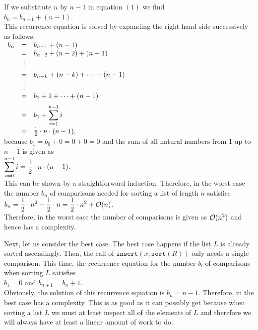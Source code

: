If we substitute $n$ by $n-1$ in equation $(1)$ we find
\\[0.2cm]
\hspace*{1.3cm}
$b_n = b_{n-1} + (n - 1)$.
\\[0.2cm]
This recurrence equation is solved by expanding the right hand side successively as follows:
\\[0.2cm]
\hspace*{1.3cm}
$
\begin{array}[t]{lcl}
  b_{n} & = & b_{n-1} + (n - 1)                     \\ 
        & = & b_{n-2} + (n - 2) + (n - 1)           \\ 
        & \vdots &                                  \\
        & = & b_{n-k} + (n - k) + \cdots + (n - 1)  \\ 
        & \vdots &                                  \\
        & = & b_{1} + 1 + \cdots + (n - 1)      \\[0.2cm] 
        & = & \displaystyle b_{1} + \sum\limits_{i = 1}^{n - 1} i \\[0.4cm]
        & = & \frac{1}{2} \cdot n \cdot (n - 1),
\end{array}
$
\\[0.2cm]
because $b_1 = b_0 + 0 = 0 + 0 = 0$ and the sum of all natural numbers from 1 up to  $n - 1$ is given as
\\[0.2cm]
\hspace*{1.3cm}
$\displaystyle\sum\limits_{i = 0}^{n - 1} i  = \frac{1}{2} \cdot n \cdot (n - 1)$.
\\[0.2cm]
This can be shown by a straightforward induction.  Therefore, in the worst case the number $b_n$ of
comparisons needed for sorting a list of length $n$  satisfies 
\\[0.2cm]
\hspace*{1.3cm}
$\displaystyle b_n = \frac{1}{2} \cdot n^2 - \frac{1}{2} \cdot n = \frac{1}{2} \cdot n^2 + \mathcal{O}(n)$.
\\[0.2cm]
Therefore, in the worst case the number of comparisons is given as $\mathcal{O}(n^2)$ and hence
 has a  complexity.


Next, let us consider the best case.  The best case happens if the list $L$ is already sorted
ascendingly.  Then, the call of 
$\mathtt{insert}(x,\mathtt{sort}(R))$ only needs a single comparison.  This time, the recurrence
equation for the number $b_l$ of comparisons when sorting $L$ satisfies
 \\[0.2cm]
\hspace*{1.3cm}
$b_1 = 0$ \quad and \quad $b_{n+1} = b_n + 1$. 
\\[0.2cm]
Obviously, the solution of this recurrence equation is $b_n = n-1$.  Therefore, in the best case
 has a  complexity.  This is as good as it can possibly get because when
sorting a list $L$ we must at least inspect all of the elements of $L$ and therefore we will always have at
least a linear amount of work to do.


